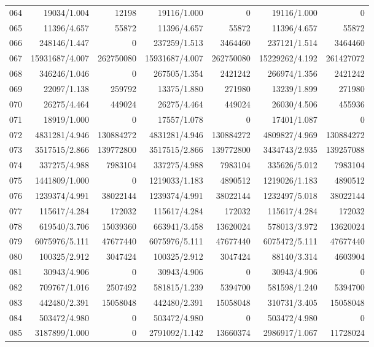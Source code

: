 \begin{longtable}{crrrrrr}
064 & 19034/1.004 & 12198 & 19116/1.000 & 0 & 19116/1.000 & 0 \\
065 & 11396/4.657 & 55872 & 11396/4.657 & 55872 & 11396/4.657 & 55872 \\
066 & 248146/1.447 & 0 & 237259/1.513 & 3464460 & 237121/1.514 & 3464460 \\
067 & 15931687/4.007 & 262750080 & 15931687/4.007 & 262750080 & 15229262/4.192 & 261427072 \\
068 & 346246/1.046 & 0 & 267505/1.354 & 2421242 & 266974/1.356 & 2421242 \\
069 & 22097/1.138 & 259792 & 13375/1.880 & 271980 & 13239/1.899 & 271980 \\
070 & 26275/4.464 & 449024 & 26275/4.464 & 449024 & 26030/4.506 & 455936 \\
071 & 18919/1.000 & 0 & 17557/1.078 & 0 & 17401/1.087 & 0 \\
072 & 4831281/4.946 & 130884272 & 4831281/4.946 & 130884272 & 4809827/4.969 & 130884272 \\
073 & 3517515/2.866 & 139772800 & 3517515/2.866 & 139772800 & 3434743/2.935 & 139257088 \\
074 & 337275/4.988 & 7983104 & 337275/4.988 & 7983104 & 335626/5.012 & 7983104 \\
075 & 1441809/1.000 & 0 & 1219033/1.183 & 4890512 & 1219026/1.183 & 4890512 \\
076 & 1239374/4.991 & 38022144 & 1239374/4.991 & 38022144 & 1232497/5.018 & 38022144 \\
077 & 115617/4.284 & 172032 & 115617/4.284 & 172032 & 115617/4.284 & 172032 \\
078 & 619540/3.706 & 15039360 & 663941/3.458 & 13620024 & 578013/3.972 & 13620024 \\
079 & 6075976/5.111 & 47677440 & 6075976/5.111 & 47677440 & 6075472/5.111 & 47677440 \\
080 & 100325/2.912 & 3047424 & 100325/2.912 & 3047424 & 88140/3.314 & 4603904 \\
081 & 30943/4.906 & 0 & 30943/4.906 & 0 & 30943/4.906 & 0 \\
082 & 709767/1.016 & 2507492 & 581815/1.239 & 5394700 & 581598/1.240 & 5394700 \\
083 & 442480/2.391 & 15058048 & 442480/2.391 & 15058048 & 310731/3.405 & 15058048 \\
084 & 503472/4.980 & 0 & 503472/4.980 & 0 & 503472/4.980 & 0 \\
085 & 3187899/1.000 & 0 & 2791092/1.142 & 13660374 & 2986917/1.067 & 11728024 \\

\end{longtable}
